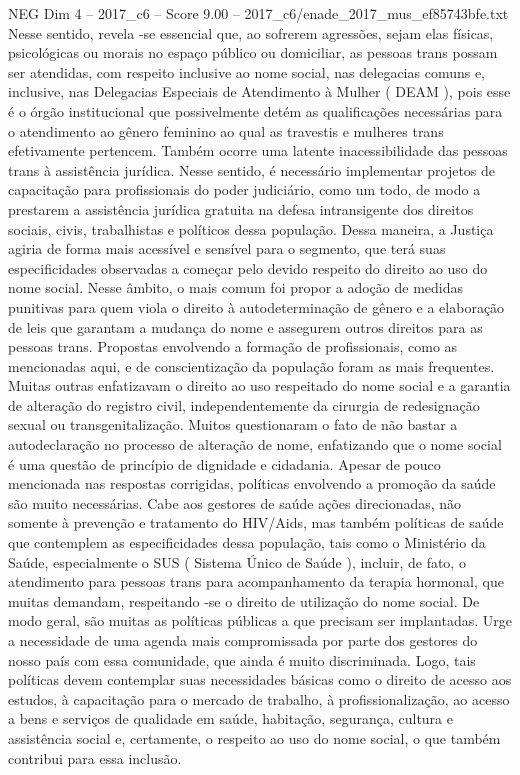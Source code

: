 \begin{textsample}{NEG Dim 4 – 2017\_c6 – Score 9.00 – 2017\_c6/enade\_2017\_mus\_ef85743bfe.txt}
Nesse sentido, revela -se essencial que, ao sofrerem agressões, sejam elas físicas, psicológicas ou morais no espaço público ou domiciliar, as pessoas trans possam ser atendidas, com respeito inclusive ao nome social, nas delegacias comuns e, inclusive, nas Delegacias Especiais de Atendimento à Mulher ( DEAM ), pois esse é o órgão institucional que possivelmente detém as qualificações necessárias para o atendimento ao gênero feminino ao qual as travestis e mulheres trans efetivamente pertencem.
Também ocorre uma latente inacessibilidade das pessoas trans à assistência jurídica.
Nesse sentido, é necessário implementar projetos de capacitação para profissionais do poder judiciário, como um todo, de modo a prestarem a assistência jurídica gratuita na defesa intransigente dos direitos sociais, civis, trabalhistas e políticos dessa população.
Dessa maneira, a Justiça agiria de forma mais acessível e sensível para o segmento, que terá suas especificidades observadas a começar pelo devido respeito do direito ao uso do nome social.
Nesse âmbito, o mais comum foi propor a adoção de medidas punitivas para quem viola o direito à autodeterminação de gênero e a elaboração de leis que garantam a mudança do nome e assegurem outros direitos para as pessoas trans.
Propostas envolvendo a formação de profissionais, como as mencionadas aqui, e de conscientização da população foram as mais frequentes.
Muitas outras enfatizavam o direito ao uso respeitado do nome social e a garantia de alteração do registro civil, independentemente da cirurgia de redesignação sexual ou transgenitalização.
Muitos questionaram o fato de não bastar a autodeclaração no processo de alteração de nome, enfatizando que o nome social é uma questão de princípio de dignidade e cidadania.
Apesar de pouco mencionada nas respostas corrigidas, políticas envolvendo a promoção da saúde são muito necessárias.
Cabe aos gestores de saúde ações direcionadas, não somente à prevenção e tratamento do HIV/Aids, mas também políticas de saúde que contemplem as especificidades dessa população, tais como o Ministério da Saúde, especialmente o SUS ( Sistema Único de Saúde ), incluir, de fato, o atendimento para pessoas trans para acompanhamento da terapia hormonal, que muitas demandam, respeitando -se o direito de utilização do nome social.
De modo geral, são muitas as políticas públicas a que precisam ser implantadas.
Urge a necessidade de uma agenda mais compromissada por parte dos gestores do nosso país com essa comunidade, que ainda é muito discriminada.
Logo, tais políticas devem contemplar suas necessidades básicas como o direito de acesso aos estudos, à capacitação para o mercado de trabalho, à profissionalização, ao acesso a bens e serviços de qualidade em saúde, habitação, segurança, cultura e assistência social e, certamente, o respeito ao uso do nome social, o que também contribui para essa inclusão.

\end{textsample}
